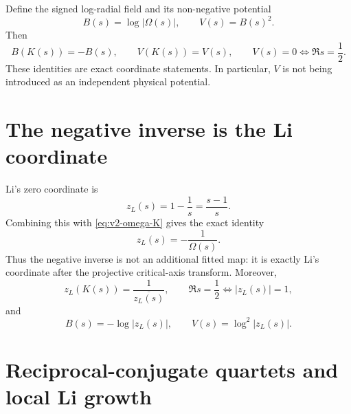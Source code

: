 Define the signed log-radial field and its non-negative potential
\begin{equation}
 B(s)=\log|\Omega(s)|,
 \qquad
 V(s)=B(s)^2.
 \label{eq:v2-BV}
\end{equation}
Then
\begin{equation}
 B(K(s))=-B(s),
 \qquad
 V(K(s))=V(s),
 \qquad
 V(s)=0\iff\Re s=\frac12.
 \label{eq:v2-BV-symmetry}
\end{equation}
These identities are exact coordinate statements. In particular, $V$ is not being introduced as an independent physical potential.

\section{The negative inverse is the Li coordinate}

Li's zero coordinate is
\begin{equation}
 z_L(s)=1-\frac1s=\frac{s-1}{s}.
 \label{eq:v2-li-coordinate}
\end{equation}
Combining this with \cref{eq:v2-omega-K} gives the exact identity
\begin{equation}
 \boxed{z_L(s)=-\frac1{\Omega(s)}.}
 \label{eq:v2-negative-inverse}
\end{equation}
Thus the negative inverse is not an additional fitted map: it is exactly Li's coordinate after the projective critical-axis transform. Moreover,
\begin{equation}
 z_L(K(s))=\frac1{\overline{z_L(s)}},
 \qquad
 \Re s=\frac12\iff|z_L(s)|=1,
 \label{eq:v2-li-K}
\end{equation}
and
\begin{equation}
 B(s)=-\log|z_L(s)|,
 \qquad
 V(s)=\log^2|z_L(s)|.
 \label{eq:v2-li-BV}
\end{equation}

\section{Reciprocal-conjugate quartets and local Li growth}

